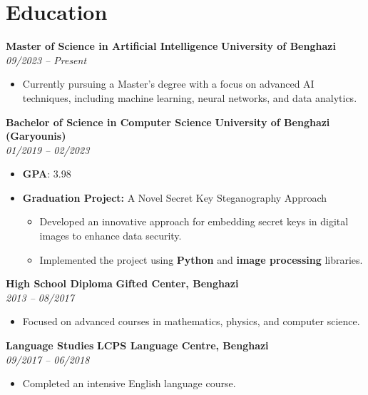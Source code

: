 \documentclass[10pt, letterpaper]{article}
\begin{document}
    \section{Education}
      \vspace{0.2 cm}
\noindent\textbf{Master of Science in Artificial Intelligence} \hfill \textbf{University of Benghazi} \\
\textit{09/2023 – Present} \\
\begin{itemize}
    \item Currently pursuing a Master's degree with a focus on advanced AI techniques, including machine learning, neural networks, and data analytics.
\end{itemize}

\noindent\textbf{Bachelor of Science in Computer Science} \hfill \textbf{University of Benghazi (Garyounis)} \\
\textit{01/2019 – 02/2023} \\
\begin{itemize}
    \item \textbf{GPA}: 3.98
    \item \textbf{Graduation Project:} A Novel Secret Key Steganography Approach
    \begin{itemize}
        \item Developed an innovative approach for embedding secret keys in digital images to enhance data security.
        \item Implemented the project using \textbf{Python} and \textbf{image processing} libraries.
    \end{itemize}
\end{itemize}

\noindent\textbf{High School Diploma} \hfill \textbf{Gifted Center, Benghazi} \\
\textit{2013 – 08/2017} \\
\begin{itemize}
    \item Focused on advanced courses in mathematics, physics, and computer science.
\end{itemize}

\noindent\textbf{Language Studies} \hfill \textbf{LCPS Language Centre, Benghazi} \\
\textit{09/2017 – 06/2018} \\
\begin{itemize}
    \item Completed an intensive English language course.
\end{itemize}
\end{document}
